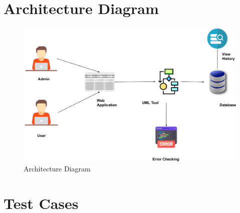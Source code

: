 \documentclass[12pt,a4paper]{article}
\begin{document}


\newpage
\section{Architecture Diagram}
\begin{figure}[h]
 \centering
\includegraphics[scale=0.44]{Diagram/Architectyre Diagram.png}
\caption{Architecture Diagram}
\end{figure}
\newpage
\section{Test Cases}
\end{document}
